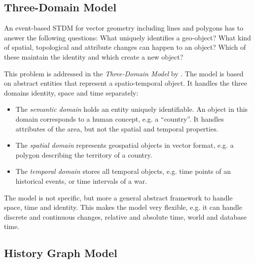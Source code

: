 

\subsection{Three-Domain Model} %
\label{sub:three_domain_model}

An event-based STDM for vector geometry including lines and polygons has to answer the following questions: What uniquely identifies a geo-object? What kind of spatial, topological and attribute changes can happen to an object? Which of these maintain the identity and which create a new object?
\cite{yuan96temporal}

This problem is addressed in the \emph{Three-Domain Model} by \cite{yuan96threedomain}. The model is based on abstract entities that represent a spatio-temporal object. It handles the three domains identity, space and time separately:
\begin{itemize}
  \item The \emph{semantic domain} holds an entity uniquely identifiable. An object in this domain corresponds to a human concept, e.g. a ``country''. It handles attributes of the area, but not the spatial and temporal properties.
  \item The \emph{spatial domain} represents geospatial objects in vector format, e.g. a polygon describing the territory of a country.
  \item The \emph{temporal domain} stores all temporal objects, e.g. time points of an historical events, or time intervals of a war.
\end{itemize}

The model is not specific, but more a general abstract framework to handle space, time and identity. This makes the model very flexible, e.g. it can handle discrete and continuous changes, relative and absolute time, world and database time.


\subsection{History Graph Model} %
\label{sub:history_graph_model}

